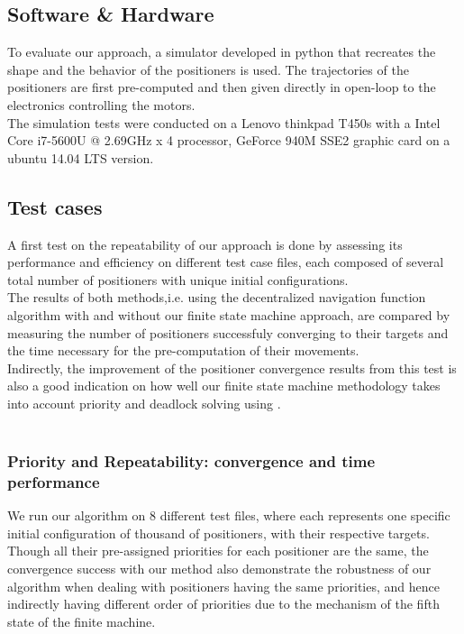 \documentclass[]{spie}  %
\begin{document}
	\subsection{Software \& Hardware}
	\label{Software Hardware}
	To evaluate our approach, a simulator developed in python that recreates the shape and the behavior of the positioners is used. The trajectories of the positioners are first pre-computed and then given directly in open-loop to the electronics controlling the motors.\\  
	The simulation tests were conducted on a Lenovo thinkpad T450s with a Intel Core i7-5600U @ 2.69GHz x 4 processor, GeForce 940M SSE2 graphic card on a ubuntu 14.04 LTS version.
	\subsection{Test cases}
	\label{Test cases}
	A first test on the repeatability of our approach is done by assessing its performance and efficiency on different test case files, each composed of several total number of positioners with unique initial configurations.\\
	The results of both methods,i.e. using the decentralized navigation function algorithm with and without our finite state machine approach, are compared by measuring the number of positioners successfuly converging to their targets and the time necessary for the pre-computation of their movements.\\
	Indirectly, the improvement of the positioner convergence results from this test is also a good indication on how well our finite state machine methodology takes into account priority and deadlock solving using . \\\\
	
	\subsubsection{Priority and Repeatability: convergence and time performance}
	We run our algorithm on 8 different test files, where each represents one specific initial configuration of thousand of positioners, with their respective targets. Though all their pre-assigned priorities for each positioner are the same, the convergence success with our method also demonstrate the robustness of our algorithm when dealing with positioners having the same priorities, and hence indirectly having different order of priorities due to the mechanism of the fifth state of the finite machine. \\
	
\end{document}
